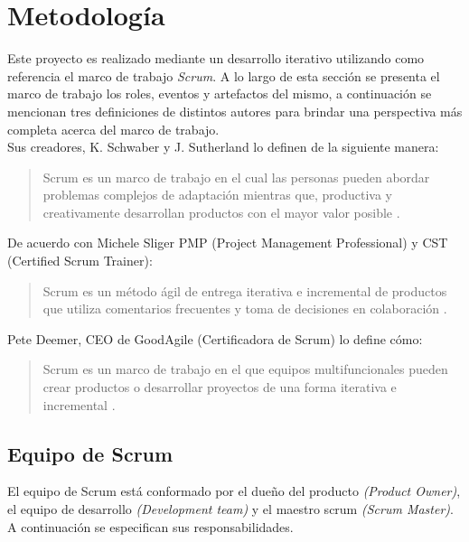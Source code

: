 \section{Metodología}

 Este proyecto es realizado mediante un desarrollo iterativo utilizando como referencia
 el marco de trabajo {\it Scrum}. A lo largo de esta sección se presenta el marco de trabajo
 los roles, eventos y artefactos del mismo, a continuación se mencionan tres definiciones
 de distintos autores para brindar una perspectiva más completa acerca del marco de trabajo.\\

    \noindent Sus creadores, K. Schwaber y J. Sutherland lo definen de la siguiente manera:
        \begin{quote}
        Scrum es un marco de trabajo en el cual las personas pueden abordar
        problemas complejos de adaptación mientras que, productiva y creativamente
        desarrollan productos con el mayor valor posible \cite{TheScrumGuide}.
        \end{quote}

    \noindent De acuerdo con Michele Sliger PMP (Project Management Professional) y CST (Certified Scrum Trainer):
        \begin{quote}
        Scrum es un método ágil de entrega iterativa e incremental de productos que
        utiliza comentarios frecuentes y toma de decisiones en colaboración \cite{Sliger1}.
        \end{quote}

    \noindent Pete Deemer, CEO de GoodAgile (Certificadora de Scrum) lo define cómo:
        \begin{quote}
        Scrum es un marco de trabajo en el que equipos multifuncionales pueden crear productos
        o desarrollar proyectos de una forma iterativa e incremental \cite{ScrumPrimer}.
        \end{quote}


\clearpage

\subsection{Equipo de Scrum}

 El equipo de Scrum está conformado por el dueño del producto {\em(Product Owner)}, el equipo
 de desarrollo {\em(Development team)} y el maestro scrum {\em(Scrum Master)}. A continuación
 se especifican sus responsabilidades.

